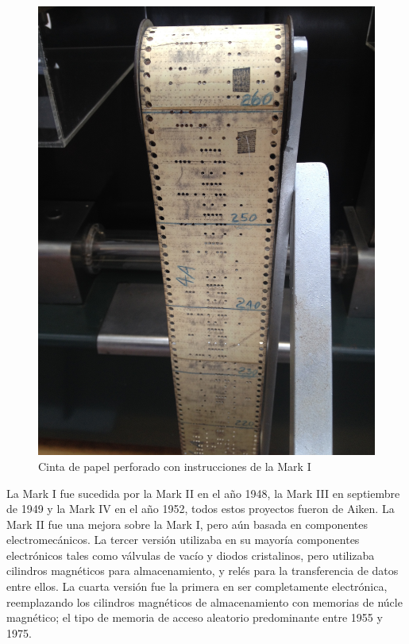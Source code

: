 \begin{figure}
  \centering
  \includegraphics[scale=0.05]{./figures/C02-mark_i_instruction_tape}
  \captionsetup{justification=centering}
  \caption{Cinta de papel perforado con instrucciones de la Mark I}
  \label{fig:C02-mark_i_instruction_tape}
\end{figure}
La Mark I fue sucedida por la Mark II en el año 1948, la Mark III en septiembre
de 1949 y la Mark IV en el año 1952, todos estos proyectos fueron de Aiken. La
Mark II fue una mejora sobre la Mark I, pero aún basada en componentes
electromecánicos. La tercer versión utilizaba en su mayoría componentes
electrónicos tales como válvulas de vacío y diodos cristalinos, pero utilizaba
cilindros magnéticos para almacenamiento, y relés para la transferencia de datos
entre ellos. La cuarta versión fue la primera en ser completamente electrónica,
reemplazando los cilindros magnéticos de almacenamiento con memorias de núcle
magnético; el tipo de memoria de acceso aleatorio predominante entre 1955 y
1975.

